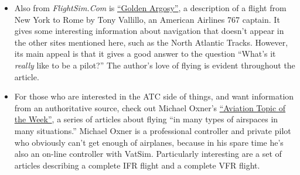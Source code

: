 \begin{itemize}
%
%

%
%

%
%

\item Also from \textit{FlightSim.Com} is
  \href{http://www.flightsim.com/vbfs/content.php?1756}{``Golden
    Argosy''}, a description of a flight from New York to Rome by Tony
  Vallillo, an American Airlines 767 captain.  It gives some
  interesting information about navigation that doesn't appear in the
  other sites mentioned here, such as the North Atlantic Tracks.
  However, its main appeal is that it gives a good answer to the
  question ``What's it \emph{really} like to be a pilot?''  The
  author's love of flying is evident throughout the article.

\item For those who are interested in the ATC side of things, and want
  information from an authoritative source, check out Michael Oxner's
  \href{http://bathursted.ccnb.nb.ca/vatcan/fir/moncton/WeeklyTopics/WeeklyTopicIntro.html}{``Aviation
    Topic of the Week''}, a series of articles about flying ``in many
  types of airspaces in many situations.''  Michael Oxner is a
  professional controller and private pilot who obviously can't get
  enough of airplanes, because in his spare time he's also an on-line
  controller with VatSim.  Particularly interesting are a set of
  articles describing a complete IFR flight and a complete VFR flight.





\end{itemize}
